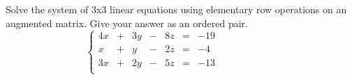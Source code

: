 \documentclass[11pt,addpoints,answers]{exam}
\newcommand{\+}{\, \, + \, \, }
\renewcommand{\-}{\, \, - \, \, }
\renewcommand{\=}{\, \, = \, \, }
\begin{document}
\begin{questions}
\vspace{1.5in}
\begin{flushright}\end{flushright}
\vspace{.5cm}

\question[24] Solve the system of $3$x$3$ linear equations using elementary row operations on an augmented matrix.  Give your answer as an ordered pair.
\begin{equation*}
\left\{
\begin{alignedat}{4}
4x & {}+{} & 3y & {}-{} & 8z & {}={} & -19\quad\quad\quad\quad\quad\quad\\
x & {}+{} & y & {}-{} & 2z & {}={} & -4 \quad\quad\quad\quad\quad\quad\\
3x & {}+{} & 2y & {}-{} & 5z & {}={} & -13 \quad\quad\quad\quad\quad\quad\\
\end{alignedat}
\right.\end{equation*}

\vspace{3.5in}
\begin{flushright}\end{flushright}


  \vfill
\pagestyle{empty}

\end{questions}
\end{document}
